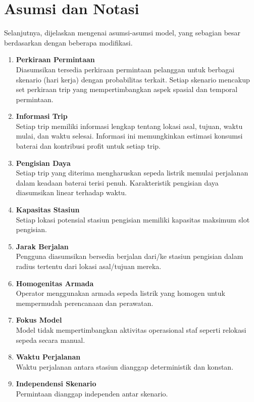 \section{Asumsi dan Notasi}

Selanjutnya, dijelaskan mengenai asumsi-asumsi model, yang sebagian besar berdasarkan  dengan beberapa modifikasi.
\begin{enumerate}
    \item \textbf{Perkiraan Permintaan}\\ Diasumsikan tersedia perkiraan permintaan pelanggan untuk berbagai skenario (hari kerja) dengan probabilitas terkait. Setiap skenario mencakup set perkiraan trip yang mempertimbangkan aspek spasial dan temporal permintaan.
    \item \textbf{Informasi Trip}\\ Setiap trip memiliki informasi lengkap tentang lokasi asal, tujuan, waktu mulai, dan waktu selesai. Informasi ini memungkinkan estimasi konsumsi baterai dan kontribusi profit untuk setiap trip.
    \item \textbf{Pengisian Daya}\\ Setiap trip yang diterima mengharuskan sepeda listrik memulai perjalanan dalam keadaan baterai terisi penuh. Karakteristik pengisian daya diasumsikan linear terhadap waktu.
    \item \textbf{Kapasitas Stasiun}\\ Setiap lokasi potensial stasiun pengisian memiliki kapasitas maksimum slot pengisian.
    \item \textbf{Jarak Berjalan}\\ Pengguna diasumsikan bersedia berjalan dari/ke stasiun pengisian dalam radius tertentu dari lokasi asal/tujuan mereka.
    \item \textbf{Homogenitas Armada}\\ Operator menggunakan armada sepeda listrik yang homogen untuk mempermudah perencanaan dan perawatan.
    \item \textbf{Fokus Model}\\ Model tidak mempertimbangkan aktivitas operasional staf seperti relokasi sepeda secara manual.
    \item \textbf{Waktu Perjalanan}\\ Waktu perjalanan antara stasiun dianggap deterministik dan konstan.
    \item \textbf{Independensi Skenario}\\ Permintaan dianggap independen antar skenario.

\end{enumerate}
